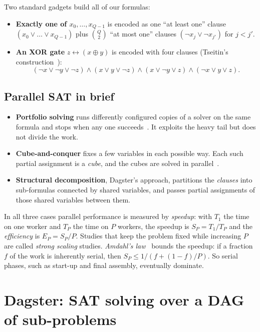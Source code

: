 \documentclass[11pt,a4paper]{article}
\begin{document}
Two standard gadgets build all of our formulas:
\begin{itemize}
\item \textbf{Exactly one of $x_0,\dots,x_{Q-1}$} is encoded as one ``at least one'' clause
      $(x_0\lor\dots\lor x_{Q-1})$ plus $\binom{Q}{2}$ ``at most one'' clauses
      $(\neg x_j\lor\neg x_{j'})$ for $j<j'$.
\item \textbf{An XOR gate} $z \leftrightarrow (x\oplus y)$ is encoded with four clauses
      (Tseitin's construction~\cite{tseitin1968}):
      \[
      (\neg x\lor\neg y\lor\neg z)\land(x\lor y\lor\neg z)\land(x\lor\neg y\lor z)\land(\neg x\lor y\lor z).
      \]
\end{itemize}

\subsection{Parallel SAT in brief}
\label{sec:parallel}
\begin{itemize}
\item \textbf{Portfolio solving} runs differently configured copies of a solver on the same
      formula and stops when any one succeeds~\cite{hamadi2009manysat}. It exploits the
      heavy tail but does not divide the work.
\item \textbf{Cube-and-conquer} fixes a few variables in each possible way. Each such
      partial assignment is a \emph{cube}, and the cubes are solved in
      parallel~\cite{heule2011cube}.
\item \textbf{Structural decomposition}, Dagster's approach, partitions the \emph{clauses}
      into sub-formulas connected by shared variables, and passes partial assignments of
      those shared variables between them.
\end{itemize}
In all three cases parallel performance is measured by \emph{speedup}: with
$T_1$ the time on one worker and $T_P$ the time on $P$ workers, the speedup is
$S_P = T_1/T_P$ and the \emph{efficiency} is $E_P = S_P/P$. Studies that keep the problem
fixed while increasing $P$ are called \emph{strong scaling} studies. \emph{Amdahl's
law}~\cite{amdahl1967} bounds the speedup: if a fraction $f$ of the work is inherently
serial, then $S_P \le 1/(f + (1-f)/P)$. So serial phases, such as start-up and final
assembly, eventually dominate.

\section{Dagster: SAT solving over a DAG of sub-problems}
\label{sec:dagster}
\end{document}

